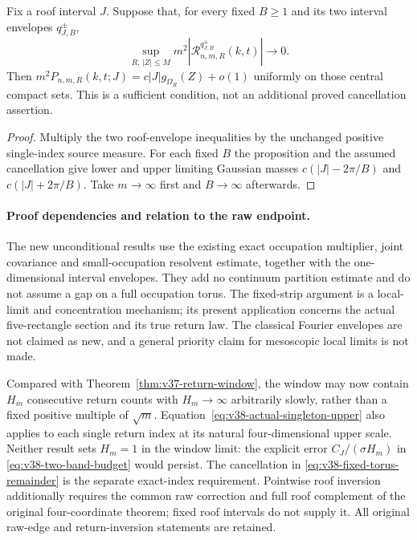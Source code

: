 \begin{corollary}
\label{cor:v38-single-index-criterion}
Fix a roof interval $J$. Suppose that, for every fixed $B\ge1$ and
its two interval envelopes $q_{J,B}^{\pm}$,
\[
 \sup_{R,\,|Z|\le M}m^2
       |\mathcal R^{q_{J,B}^{\pm}}_{n,m,R}(k,t)|\longrightarrow0.
\]
Then $m^2P_{n,m,R}(k,t;J)=c|J|g_{\Omega_R}(Z)+o(1)$ uniformly on
those central compact sets. This is a sufficient condition, not an
additional proved cancellation assertion.
\end{corollary}
\begin{proof}
Multiply the two roof-envelope inequalities by the unchanged positive
single-index source measure. For each fixed $B$ the proposition and
the assumed cancellation give lower and upper limiting Gaussian
masses $c(|J|-2\pi/B)$ and $c(|J|+2\pi/B)$. Take $m\to\infty$
first and $B\to\infty$ afterwards.
\end{proof}

\paragraph{Proof dependencies and relation to the raw endpoint.}
The new unconditional results use the existing exact occupation
multiplier, joint covariance and small-occupation resolvent estimate,
together with the one-dimensional interval envelopes. They add no
continuum partition estimate and do not assume a gap on a full
occupation torus. The fixed-strip argument is a local-limit and
concentration mechanism; its present application concerns the actual
five-rectangle section and its true return law. The classical Fourier
envelopes are not claimed as new, and a general priority claim for
mesoscopic local limits is not made.

Compared with Theorem~\ref{thm:v37-return-window}, the window may now
contain $H_m$ consecutive return counts with $H_m\to\infty$ arbitrarily
slowly, rather than a fixed positive multiple of $\sqrt m$.
Equation~\eqref{eq:v38-actual-singleton-upper} also applies to each
single return index at its natural four-dimensional upper scale.
Neither result sets $H_m=1$ in the window limit: the explicit error
$C_J/(\sigma H_m)$ in \eqref{eq:v38-two-band-budget} would persist.
The cancellation in \eqref{eq:v38-fixed-torus-remainder} is the
separate exact-index requirement. Pointwise roof inversion additionally
requires the common raw correction and full roof complement of the
original four-coordinate theorem; fixed roof intervals do not supply
it. All original raw-edge and return-inversion statements are retained.

